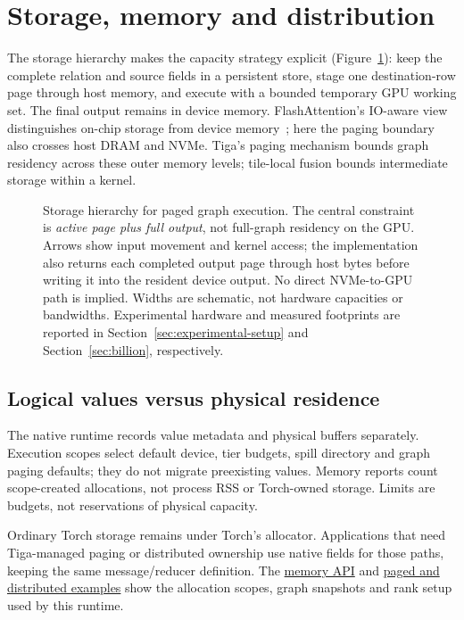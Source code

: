 \section{Storage, memory and distribution}
\label{sec:runtime}
The storage hierarchy makes the capacity strategy explicit
(Figure~\ref{fig:storage-hierarchy}): keep the complete relation and source
fields in a persistent store, stage one destination-row page through host
memory, and execute with a bounded temporary GPU working set. The final output
remains in device memory. FlashAttention's IO-aware view distinguishes on-chip
storage from device memory~\cite{flashattention}; here the paging boundary also
crosses host DRAM and NVMe. Tiga's paging mechanism bounds graph residency across
these outer memory levels; tile-local fusion bounds intermediate storage within a kernel.

\begin{figure}[htbp]
\centering

\caption{Storage hierarchy for paged graph execution. The central
constraint is \emph{active page plus full output}, not full-graph residency on
the GPU. Arrows show input movement and kernel access; the implementation also
returns each completed output page through host bytes before writing it into
the resident device output. No direct NVMe-to-GPU path is implied. Widths are
schematic, not hardware capacities or bandwidths. Experimental hardware and
measured footprints are reported in Section~\ref{sec:experimental-setup} and
Section~\ref{sec:billion}, respectively.}
\label{fig:storage-hierarchy}
\end{figure}

\subsection{Logical values versus physical residence}
\label{sec:gpu-paging}
The native runtime records value metadata and physical buffers separately.
Execution scopes select default device, tier budgets, spill directory and graph
paging defaults; they do not migrate preexisting values. Memory reports count
scope-created allocations, not process RSS or Torch-owned storage. Limits are
budgets, not reservations of physical capacity.

Ordinary Torch storage remains under Torch's allocator. Applications that need
Tiga-managed paging or distributed ownership use native 
fields for those paths, keeping the same message/reducer definition. The
\href{https://walkerchi.github.io/TIGA-lang/memory/}{memory API} and
\href{https://walkerchi.github.io/TIGA-lang/examples/distributed-memory/}{paged and distributed examples}
show the allocation scopes, graph snapshots and rank setup used by this runtime.

